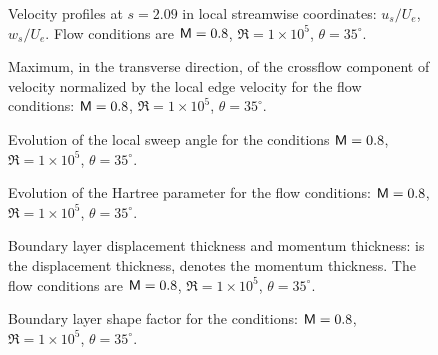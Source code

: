 %
\begin{figure}[p]
\centering
{}
\epsfxsize=5.4in 
\caption [Velocity profiles at $s=2.09$] {Velocity profiles at $s=2.09$ in
local streamwise coordinates: \solid $u_s/U_e$, \dashed $w_s/U_e$.  Flow
conditions are ${\sf M}=0.8$, $\Re=1\times 10^5$, $\theta=35^\circ$. \label{f:pro3}
}
\end{figure}
%
\begin{figure}[p]
\centering
{}
\epsfxsize=5.4in 
\caption [Maximum, in the transverse direction, of crossflow velocity] {Maximum, in the transverse direction, of the crossflow
component of velocity normalized by the local edge velocity for the flow
conditions: ${\sf M}=0.8$, $\Re=1\times 10^5$, $\theta=35^\circ$. \label{f:r4.wmax}
}
\end{figure}
%
\begin{figure}[p]
\centering
{}
\epsfxsize=5.4in 
\caption[Evolution of the local sweep angle] {Evolution of the local sweep
angle for the conditions ${\sf M}=0.8$, $\Re=1\times 10^5$, $\theta=35^\circ$.
\label{f:r4.thetae} }
\end{figure}
%
\begin{figure}[p]
\centering
{}
\epsfxsize=5.4in 
\caption[Evolution of the Hartree parameter] {Evolution of the Hartree
parameter for the flow conditions: ${\sf M}=0.8$, $\Re=1\times 10^5$,
$\theta=35^\circ$.
\label{f:r4.betah} }
\end{figure}
%
\begin{figure}[p]
\centering
{}
\epsfxsize=5.4in 
\caption[Boundary layer displacement thickness and momentum thickness]
{Boundary layer displacement thickness and momentum thickness: \solid is the
displacement thickness, \dashed denotes the momentum thickness.  The flow
conditions are ${\sf M}=0.8$, $\Re=1\times 10^5$, $\theta=35^\circ$.
\label{f:r4.thick} }
\end{figure}
%
\begin{figure}[p]
\centering
{}
\epsfxsize=5.4in 
\caption[Boundary layer shape factor] {Boundary layer shape factor for the
conditions: ${\sf M}=0.8$, $\Re=1\times 10^5$, $\theta=35^\circ$.
\label{f:r4.shape} }
\end{figure}
